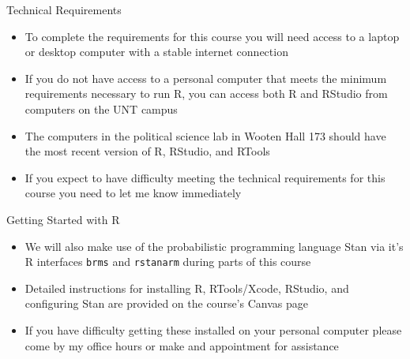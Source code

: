 \documentclass[12pt,ignorenonframetext,aspectratio=169]{beamer}
\begin{document}
\begin{frame}{Technical Requirements}
\protect\hypertarget{technical-requirements}{}
\begin{itemize}[<+->]
\item
  To complete the requirements for this course you will need access to a
  laptop or desktop computer with a stable internet connection
\item
  If you do not have access to a personal computer that meets the
  minimum requirements necessary to run R, you can access both R and
  RStudio from computers on the UNT campus
\item
  The computers in the political science lab in Wooten Hall 173 should
  have the most recent version of R, RStudio, and RTools
\item
  If you expect to have difficulty meeting the technical requirements
  for this course you need to let me know immediately
\end{itemize}
\end{frame}

\begin{frame}[fragile]{Getting Started with R}
\protect\hypertarget{getting-started-with-r}{}
\begin{itemize}[<+->]
\item
  We will also make use of the probabilistic programming language Stan
  via it's R interfaces \texttt{brms} and \texttt{rstanarm} during parts
  of this course
\item
  Detailed instructions for installing R, RTools/Xcode, RStudio, and
  configuring Stan are provided on the course's Canvas page
\item
  If you have difficulty getting these installed on your personal
  computer please come by my office hours or make and appointment for
  assistance
\end{itemize}
\end{frame}
\end{document}
